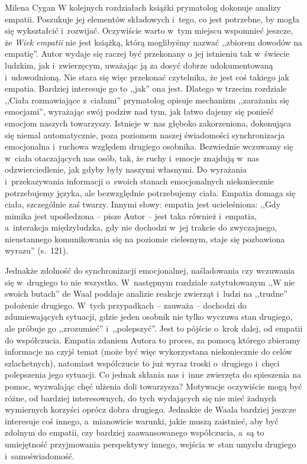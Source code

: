 \begin{recplenv}{Milena Cygan}
W kolejnych rozdziałach książki prymatolog dokonuje analizy empatii. Poszukuje jej elementów składowych i~tego, co jest
potrzebne, by mogła się wykształcić i~rozwijać. Oczywiście warto w~tym miejscu wspomnieć jeszcze, że \textit{Wiek
empatii} nie jest książką, którą moglibyśmy nazwać ,,zbiorem dowodów na empatię''. Autor wydaje się raczej być przekonany
o jej istnieniu tak w~świecie ludzkim, jak i~zwierzęcym, uważając ją za dosyć dobrze udokumentowaną i~udowodnioną. Nie
stara się więc przekonać czytelnika, że jest coś takiego jak empatia. Bardziej interesuje go to ,,jak'' ona jest. Dlatego
w trzecim rozdziale ,,Ciała rozmawiające z~ciałami'' prymatolog opisuje mechanizm ,,zarażania się emocjami'', wyrażając
swój podziw nad tym, jak łatwo dajemy się ponieść emocjom naszych towarzyszy. Istnieje w~nas głęboko zakorzeniona,
dokonująca się niemal automatycznie, poza poziomem naszej świadomości synchronizacja emocjonalna i~ruchowa względem
drugiego osobnika. Bezwiednie wczuwamy się w~ciała otaczających nas osób, tak, że ruchy i~emocje znajdują w~nas
odzwierciedlenie, jak gdyby były naszymi własnymi. Do wyrażania i~przekazywania informacji o~swoich stanach
emocjonalnych niekoniecznie potrzebujemy języka, ale bezwzględnie potrzebujemy ciała. Empatia domaga się ciała,
szczególnie zaś twarzy. Innymi słowy: empatia jest ucieleśniona: ,,Gdy mimika jest upośledzona -- pisze Autor -- jest taka
również i~empatia, a~interakcja międzyludzka, gdy nie dochodzi w~jej trakcie do zwyczajnego, nieustannego komunikowania
się na poziomie cielesnym, staje się pozbawiona wyrazu'' (s.~121).

Jednakże zdolność do synchronizacji emocjonalnej, naśladowania czy wczuwania się w~drugiego to nie wszystko. W~następnym
rozdziale zatytułowanym ,,W nie swoich butach'' de Waal poddaje analizie reakcje zwierząt i~ludzi na ,,trudne'' położenie
drugiego. W~tych przypadkach -- zauważa -- dochodzi do zdumiewających sytuacji, gdzie jeden osobnik nie tylko wyczuwa
stan drugiego, ale próbuje go ,,zrozumieć'' i~,,polepszyć''. Jest to pójście o~krok dalej, od empatii do współczucia.
Empatia zdaniem Autora to proces, za pomocą którego zbieramy informacje na czyjś temat (może być więc wykorzystana
niekoniecznie do celów szlachetnych), natomiast współczucie to już wyraz troski o~drugiego i~chęci polepszenia jego
sytuacji. Co jednak skłania nas i~inne zwierzęta do spieszenia na pomoc, wyzwalając chęć ulżenia doli towarzysza?
Motywacje oczywiście mogą być różne, od bardziej interesownych, do tych wydających się nie mieć żadnych wymiernych
korzyści oprócz dobra drugiego. Jednakże de Waala bardziej jeszcze interesuje coś innego, a~mianowicie warunki, jakie
muszą zaistnieć, aby być zdolnym do empatii, czy bardziej zaawansowanego współczucia, a~są to umiejętność przyjmowania
perspektywy innego, wejścia w~stan umysłu drugiego i~samoświadomość.


\end{recplenv}
